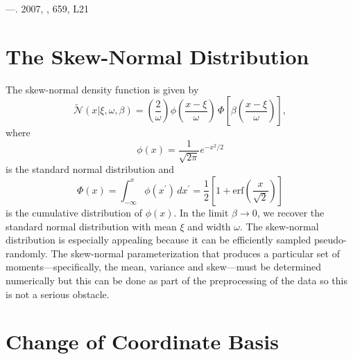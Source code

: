 \documentclass[preprint,12pt]{aastex}
\newcommand{\eqlabel}[1]{\label{eq:#1}}
\newcommand{\applabel}[1]{\label{app:#1}}
\begin{document}
\begin{thebibliography}{}
---. 2007, \apjl, 659, L21

\end{thebibliography}


\appendix

\section{The Skew-Normal Distribution}
\applabel{sn}


The skew-normal density function is given by
\citep{OHagan:1976a,Azzalini:1996}
\begin{equation}
    \eqlabel{sn}
    \tilde{\mathcal{N}} (x | \xi, \omega, \beta) =
        \left ( \frac{2}{\omega} \right )
        \phi \left ( \frac{x-\xi}{\omega} \right )
        \, \Phi \left [ \beta \left ( \frac{x-\xi}{\omega} \right ) \right ],
\end{equation}
where
\begin{equation}
    \phi (x) = \frac{1}{\sqrt{2\pi}} e^{-x^2/2}
\end{equation}
is the standard normal distribution and
\begin{equation}
    \Phi(x) = \int _{-\infty} ^x \phi(x^\prime) \, dx^\prime
        = \frac{1}{2} \left [ 1 +
            \mathrm{erf} \left ( \frac{x}{\sqrt{2}} \right )\right ]
\end{equation}
is the cumulative distribution of $\phi(x)$.  In the limit $\beta \to 0$,
we recover the standard normal distribution with mean $\xi$ and width
$\omega$.  The skew-normal distribution is especially appealing because it
can be efficiently sampled pseudo-randomly. The skew-normal parameterization
that produces a particular set of moments---specifically, the mean, variance
and skew---must be determined numerically but this can be done as part of
the preprocessing of the data so this is not a serious obstacle.


\section{Change of Coordinate Basis}

\applabel{coords}
\end{document}
